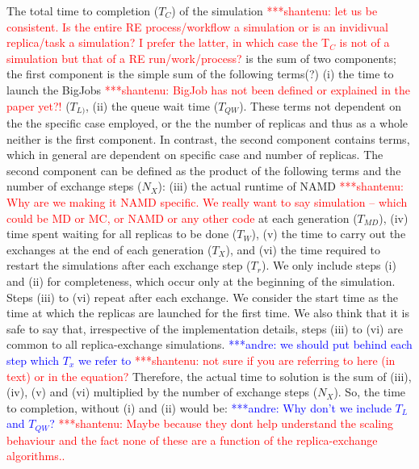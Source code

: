 \documentclass{rspublic}
\newcommand{\jhanote}[1]{ {\textcolor{red} { ***shantenu: #1 }}}
\newcommand{\alnote}[1]{ {\textcolor{blue} { ***andre: #1 }}}
\newcommand{\alnote}[1]{}
\newcommand{\jhanote}[1]{}
\begin{document}
The total time to completion ($T_{C}$) of the simulation
\jhanote{let us be consistent. Is the entire RE process/workflow a
  simulation or is an invidivual replica/task a simulation? I prefer
  the latter, in which case the T$_C$ is not of a simulation but that
  of a RE run/work/process?}  is the sum of two components; the first
component is the simple sum of the following terms(?) (i) the time to
launch the BigJobs \jhanote{BigJob has not been defined or explained
  in the paper yet?!}  ($T_{L)}$, (ii) the queue wait time
($T_{QW}$). These terms not dependent on the the specific case
employed, or the the number of replicas and thus as a whole neither is
the first component. In contrast, the second component contains terms,
which in general are dependent on specific case and number of
replicas.  The second component can be defined as
the product of the following terms and the number of exchange steps
($N_{X}$): (iii) the actual runtime of NAMD \jhanote{Why are we making
  it NAMD specific. We really want to say simulation -- which could be
  MD or MC, or NAMD or any other code} at each generation ($T_{MD}$),
(iv) time spent waiting for all replicas to be done ($T_{W}$), (v) the
time to carry out the exchanges at the end of each generation
($T_{X}$), and (vi) the time required to restart the simulations after
each exchange step ($T_{r}$). We only include steps (i) and (ii) for
completeness, which occur only at the beginning of the
simulation. Steps (iii) to (vi) repeat after each exchange. We
consider the start time as the time at which the replicas are launched
for the first time. We also think that it is safe to say that,
irrespective of the implementation details, steps (iii) to (vi) are
common to all replica-exchange simulations. \alnote{we should put
  behind each step which $T_{x}$ we refer to} \jhanote{not sure if you
  are referring to here (in text) or in the equation?} Therefore, the
actual time to solution is the sum of (iii), (iv), (v) and (vi)
multiplied by the number of exchange steps ($N_{X}$). So, the time to
completion, without (i) and (ii) would be: \alnote{Why don't we
  include $T_{L}$ and $T_{QW}$?}  \jhanote{Maybe because they dont
  help understand the scaling behaviour and the fact none of these are
  a function of the replica-exchange algorithms..}
\end{document}

